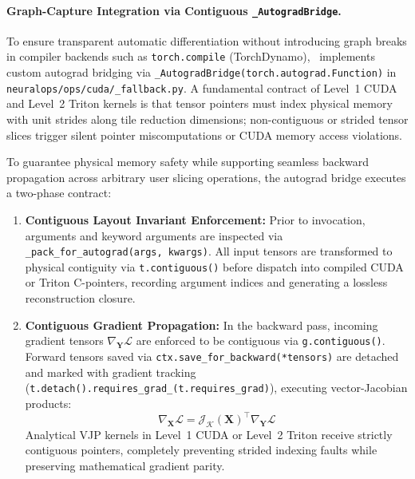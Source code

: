 \paragraph{Graph-Capture Integration via Contiguous \texttt{\_AutogradBridge}.}
To ensure transparent automatic differentiation without introducing graph breaks in compiler backends such as \texttt{torch.compile} (TorchDynamo), \neuralops\ implements custom autograd bridging via \texttt{\_AutogradBridge(torch.autograd.Function)} in \texttt{neuralops/ops/cuda/\_fallback.py}. A fundamental contract of Level~1 CUDA and Level~2 Triton kernels is that tensor pointers must index physical memory with unit strides along tile reduction dimensions; non-contiguous or strided tensor slices trigger silent pointer miscomputations or CUDA memory access violations. 

To guarantee physical memory safety while supporting seamless backward propagation across arbitrary user slicing operations, the autograd bridge executes a two-phase contract:
\begin{enumerate}
    \item \textbf{Contiguous Layout Invariant Enforcement:} Prior to invocation, arguments and keyword arguments are inspected via \texttt{\_pack\_for\_autograd(args, kwargs)}. All input tensors are transformed to physical contiguity via \texttt{t.contiguous()} before dispatch into compiled CUDA or Triton C-pointers, recording argument indices and generating a lossless reconstruction closure.
    \item \textbf{Contiguous Gradient Propagation:} In the backward pass, incoming gradient tensors $\nabla_{\mathbf{Y}} \mathcal{L}$ are enforced to be contiguous via \texttt{g.contiguous()}. Forward tensors saved via \texttt{ctx.save\_for\_backward(*tensors)} are detached and marked with gradient tracking (\texttt{t.detach().requires\_grad\_(t.requires\_grad)}), executing vector-Jacobian products:
    \begin{equation}
    \label{eq:vjp_chain}
    \nabla_{\mathbf{X}} \mathcal{L} = \mathcal{J}_{\mathcal{K}}(\mathbf{X})^\top \nabla_{\mathbf{Y}} \mathcal{L}
    \end{equation}
    Analytical VJP kernels in Level~1 CUDA or Level~2 Triton receive strictly contiguous pointers, completely preventing strided indexing faults while preserving mathematical gradient parity.
\end{enumerate}

